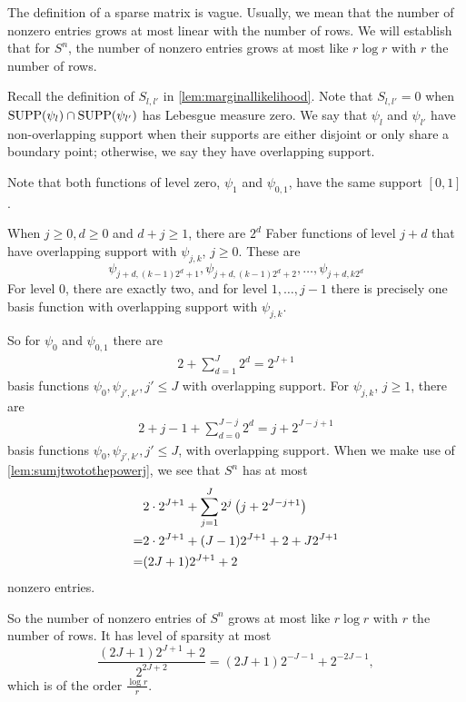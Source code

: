 \documentclass[12pt]{article}
\begin{document}
The definition of a sparse matrix is vague. Usually, we mean that the number of nonzero entries grows at most linear with the number of rows. We will establish that for $S^n$, the number of nonzero entries grows at most like $r\log r$ with $r$ the number of rows. 

Recall the definition of $S_{l,l'}$ in \cref{lem:marginallikelihood}.
Note that $S_{l,l'}=0$  when $\operatorname{SUPP}(\psi_l)\cap\operatorname{SUPP}(\psi_{l'})$ has Lebesgue measure zero. We say that $\psi_l$ and $\psi_{l'}$ have non-overlapping support when their supports are either disjoint or only share a boundary point; otherwise, we say they have overlapping support. 


Note that both functions of level zero,  \(\psi_1\) and \(\psi_{0,1}\), have the same support $[0,1]$. 

When $j\ge 0, d\ge 0$ and $d+j\ge 1$, there are \(2^d\) Faber functions of level \(j+d\) that have overlapping support with \(\psi_{j,k}\), \(j\ge 0\). These are 
\[
\psi_{j+d,(k-1)2^d+1},\psi_{j+d,(k-1)2^d+2},\ldots,\psi_{j+d,k2^d}
\]
For level 0, there are exactly two, and for level $1,\ldots,j-1$ there is precisely one basis function with overlapping support with $\psi_{j,k}$. 

So for $\psi_0$ and $\psi_{0,1}$ there are \begin{align*}
    2 + \sum_{d=1}^J 2^d = 2^{J+1} 
\end{align*}
basis functions $\psi_0,\psi_{j',k'}, j'\le J$ with overlapping support. 
For $\psi_{j,k}$, $j\ge 1$,  there are \begin{align*}
    2+ j-1 + \sum_{d=0}^{J-j} 2^d = %
    j+2^{J-j+1}
\end{align*}
basis functions $\psi_0,\psi_{j',k'}, j'\le J$, with overlapping support. When we make use of \cref{lem:sumjtwotothepowerj}, we see that $S^n$ has at most \begin{align*}
   &2\cdot 2^{J+1}+\sum_{ j=1}^J 2^j\left(j+2^{J-j+1}\right)\\
= & 2\cdot 2^{J+1}+ (J-1)2^{J+1} + 2 + J2^{J+1}  \\
= & (2J+1)2^{J+1}+2
\end{align*}
nonzero entries. 

So the number of nonzero entries of $S^n$ grows at most like $r\log r$ with $r$ the number of rows. It has level of sparsity at most
\[
\frac{(2J+1)2^{J+1}+2
}{2^{2J+2}}= (2J+1)2^{-J-1}+2^{-2J-1},
\]
which is of the order $\frac {\log r}r$. 
\appendix
\end{document}
